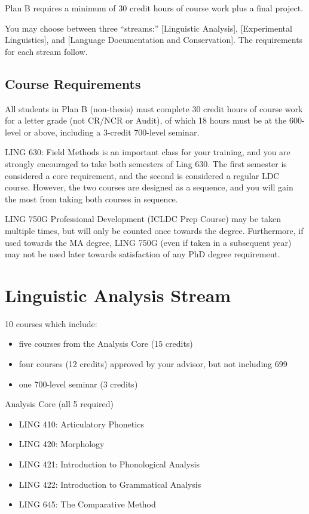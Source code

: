 \documentclass[
]{book}
\providecommand{\tightlist}{%
  \setlength{\itemsep}{0pt}\setlength{\parskip}{0pt}}
\begin{document}
Plan B requires a minimum of 30 credit hours of course work plus a final project.

You may choose between three ``streams:'' {[}Linguistic Analysis{]}, {[}Experimental Linguistics{]}, and {[}Language Documentation and Conservation{]}. The requirements for each stream follow.

\subsection{Course Requirements}\label{course-requirements-1}

All students in Plan B (non-thesis) must complete 30 credit hours of course work for a letter grade (not CR/NCR or Audit), of which 18 hours must be at the 600-level or above, including a 3-credit 700-level seminar.

LING 630: Field Methods is an important class for your training, and you are strongly encouraged to take both semesters of Ling 630. The first semester is considered a core requirement, and the second is considered a regular LDC course. However, the two courses are designed as a sequence, and you will gain the most from taking both courses in sequence.

LING 750G Professional Development (ICLDC Prep Course) may be taken multiple times, but will only be counted once towards the degree. Furthermore, if used towards the MA degree, LING 750G (even if taken in a subsequent year) may not be used later towards satisfaction of any PhD degree requirement.

\section{Linguistic Analysis Stream}\label{linguistic-analysis-stream}

10 courses which include:

\begin{itemize}
\tightlist
\item
  five courses from the Analysis Core (15 credits)
\item
  four courses (12 credits) approved by your advisor, but not including 699
\item
  one 700-level seminar (3 credits)
\end{itemize}

Analysis Core (all 5 required)

\begin{itemize}
\tightlist
\item
  LING 410: Articulatory Phonetics
\item
  LING 420: Morphology
\item
  LING 421: Introduction to Phonological Analysis
\item
  LING 422: Introduction to Grammatical Analysis
\item
  LING 645: The Comparative Method
\end{itemize}
\end{document}
